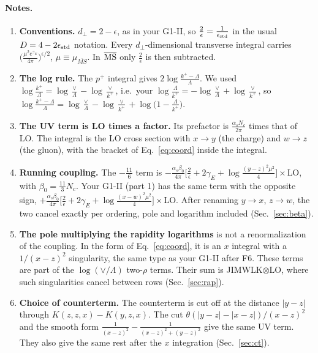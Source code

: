 \documentclass[10pt]{article}
\numberwithin{equation}{section}
\begin{document}
\paragraph{Notes.}
\begin{enumerate}
\item \textbf{Conventions.} $d_\perp=2-\epsilon$, as in your G1-II, so $\frac2\epsilon=\frac{1}{\epsilon_{\rm std}}$ in the usual $D=4-2\epsilon_{\rm std}$ notation. Every $d_\perp$-dimensional transverse integral carries $\big(\frac{\mu^2e^{\gamma_E}}{4\pi}\big)^{\epsilon/2}$, $\mu\equiv\mu_{\overline{MS}}$. In $\overline{\rm MS}$ only $\frac2\epsilon$ is then subtracted.
\item \textbf{The log rule.} The $p^+$ integral gives $2\log\frac{k^+-\Lambda}{\Lambda}$. We used $\log\frac{k^+}{\Lambda}=\log\frac\vee\Lambda-\log\frac{\vee}{k^+}$, i.e.\ your $\log\frac{\Lambda}{k^+}=-\log\frac\vee\Lambda+\log\frac\vee{k^+}$, so $\log\frac{k^+-\Lambda}{\Lambda}=\log\frac\vee\Lambda-\log\frac\vee{k^+}+\log\big(1-\frac{\Lambda}{k^+}\big)$.
\item \textbf{The UV term is LO times a factor.} Its prefactor is $\frac{\alpha_sN_c}{2\pi}$ times that of LO. The integral is the LO cross section with $x\to y$ (the charge) and $w\to z$ (the gluon), with the bracket of Eq.~\eqref{eq:coord} inside the integral.
\item \textbf{Running coupling.} The $-\frac{11}{6}$ term is $-\frac{\alpha_s\beta_0}{4\pi}\big[\frac2\epsilon+2\gamma_E+\log\frac{(y-z)^2\mu^2}{4}\big]\times$LO, with $\beta_0=\frac{11}{3}N_c$. Your G1-II (part 1) has the same term with the opposite sign, $+\frac{\alpha_s\beta_0}{4\pi}\big[\frac2\epsilon+2\gamma_E+\log\frac{(x-w)^2\mu^2}{4}\big]\times$LO. After renaming $y\to x$, $z\to w$, the two cancel exactly per ordering, pole and logarithm included (Sec.~\ref{sec:beta}).
\item \textbf{The pole multiplying the rapidity logarithms} is not a renormalization of the coupling. In the form of Eq.~\eqref{eq:coord}, it is an $x$ integral with a $1/(x-z)^2$ singularity, the same type as your G1-II after F6. These terms are part of the $\log(\vee/\Lambda)$ two-$\rho$ terms. Their sum is JIMWLK$\otimes$LO, where such singularities cancel between rows (Sec.~\ref{sec:rap}).
\item \textbf{Choice of counterterm.} The counterterm is cut off at the distance $|y-z|$ through $K(z,z,x)-K(y,z,x)$. The cut $\theta(|y-z|-|x-z|)/(x-z)^2$ and the smooth form $\frac{1}{(x-z)^2}-\frac{1}{(x-z)^2+(y-z)^2}$ give the same UV term. They also give the same rest after the $x$ integration (Sec.~\ref{sec:ct}).
\end{enumerate}
\end{document}
